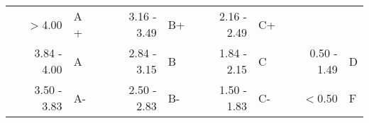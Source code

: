 \vspace{.75\baselineskip}
\begin{center}
\begin{tabular}{*{4}{rl}}
\toprule %
$>$4.00     & A + & 3.16 - 3.49 & B+ & 2.16 - 2.49 & C+ & & \\
3.84 - 4.00 & A   & 2.84 - 3.15 & B  & 1.84 - 2.15 & C  & 0.50 - 1.49 & D \\
3.50 - 3.83 & A-  & 2.50 - 2.83 & B- & 1.50 - 1.83 & C- & $<$0.50 & F \\ \bottomrule
\end{tabular}
\end{center}
\vspace{.5\baselineskip}